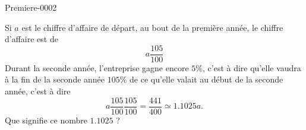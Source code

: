 
\begin{corrige}{Premiere-0002}

    Si \( a\) est le chiffre d'affaire de départ, au bout de la première année, le chiffre d'affaire est de 
    \begin{equation}
        a\frac{ 105 }{ 100}
    \end{equation}
    Durant la seconde année, l'entreprise gagne encore \( 5\%\), c'est à dire qu'elle vaudra à la fin de la seconde année \( 105\%\) de ce qu'elle valait au début de la seconde année, c'est à dire
    \begin{equation}
        a\frac{ 105 }{ 100}\frac{ 105 }{ 100 }=\frac{ 441 }{ 400 }\simeq 1.1025a.
    \end{equation}
    Que signifie ce nombre \( 1.1025\) ?

\end{corrige}
